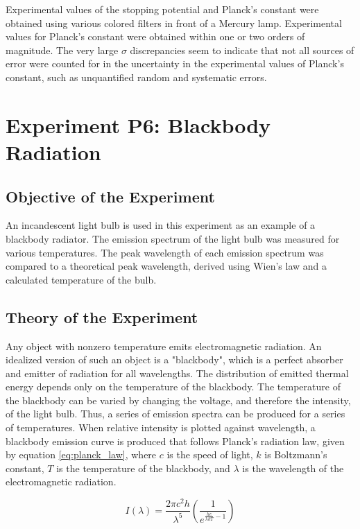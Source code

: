 \documentclass[a4paper]{article}
\begin{document}
\qq Experimental values of the stopping potential and Planck's constant were obtained using various colored filters in front of a Mercury lamp. Experimental values for Planck's constant were obtained within one or two orders of magnitude. The very large $\sigma$ discrepancies seem to indicate that not all sources of error were counted for in the uncertainty in the experimental values of Planck's constant, such as unquantified random and systematic errors.

\section{Experiment P6: Blackbody Radiation}

\subsection{Objective of the Experiment}
\qq An incandescent light bulb is used in this experiment as an example of a blackbody radiator. The emission spectrum of the light bulb was measured for various temperatures. The peak wavelength of each emission spectrum was compared to a theoretical peak wavelength, derived using Wien's law and a calculated temperature of the bulb.

\subsection{Theory of the Experiment}

\qq Any object with nonzero temperature emits electromagnetic radiation. An idealized version of such an object is a "blackbody", which is a perfect absorber and emitter of radiation for all wavelengths. The distribution of emitted thermal energy depends only on the temperature of the blackbody. The temperature of the blackbody can be varied by changing the voltage, and therefore the intensity, of the light bulb. Thus, a series of emission spectra can be produced for a series of temperatures. When relative intensity is plotted against wavelength, a blackbody emission curve is produced that follows Planck's radiation law, given by equation \ref{eq:planck_law}, where $c$ is the speed of light, $k$ is Boltzmann's constant, $T$ is the temperature of the blackbody, and $\lambda$ is the wavelength of the electromagnetic radiation.

\begin{equation}
\label{eq:planck_law}
I \left( \lambda \right) = 
\frac{2 \pi c^2 h}{\lambda^5}
\left( \frac{1}{e^{\frac{hc}{\lambda k T} - 1}} \right)
\end{equation}
\end{document}
